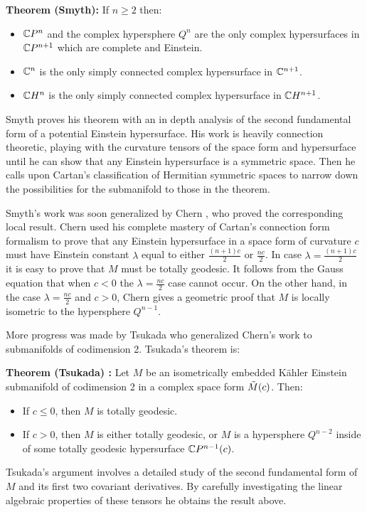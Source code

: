 {\bf Theorem (Smyth):} If $n \geq 2$ then:
%
\begin{itemize}
\item  $\mathbb{C}P^n$ and the complex hypersphere $Q^n$ are the only complex hypersurfaces in $\mathbb{C}P^{n+1}$ which are complete and Einstein.
\item  $\mathbb{C}^n$ is the only simply connected complex hypersurface in $\mathbb{C}^{n+1}$.
\item  $\mathbb{C}H^n$ is the only simply connected complex hypersurface in $\mathbb{C}H^{n+1}$.
\end{itemize}

Smyth proves his theorem with an in depth analysis of the second fundamental form of a potential Einstein hypersurface.  His work is heavily connection theoretic, playing with the curvature tensors of the space form and hypersurface until he can show that any Einstein hypersurface is a symmetric space.  Then he calls upon Cartan's classification of Hermitian symmetric spaces to narrow down the possibilities for the submanifold to those in the theorem.  

Smyth's work was soon generalized by Chern \cite{Ch}, who proved the corresponding local result.  Chern used his complete mastery of Cartan's connection form formalism to prove that any Einstein hypersurface in a space form of curvature $c$ must have Einstein constant $\lambda$ equal to either $\frac{(n+1)c}{2}$ or $\frac{nc}{2}$.  In case $\lambda = \frac{(n+1)c}{2}$ it is easy to prove that $M$ must be totally geodesic.  It follows from the Gauss equation that when $c<0$ the $\lambda = \frac{nc}{2}$ case cannot occur.  On the other hand, in the case $\lambda = \frac{nc}{2}$ and $c>0$, Chern gives a geometric proof that $M$ is locally isometric to the hypersphere $Q^{n-1}$.

More progress was made by Tsukada \cite{T} who generalized Chern's work to submanifolds of codimension 2.  Tsukada's theorem is:

{\bf Theorem (Tsukada) : } Let $M$ be an isometrically embedded K\"{a}hler Einstein submanifold of codimension 2 in a complex space form $\tilde{M}(c)$.  Then:
%
\begin{itemize}
\item If $c \leq 0$, then $M$ is totally geodesic.
\item If $c > 0$, then $M$ is either totally geodesic, or $M$ is a hypersphere $Q^{n-2}$ inside of some totally geodesic hypersurface $\mathbb{C}P^{n-1}(c)$.
\end{itemize}

Tsukada's argument involves a detailed study of the second fundamental form of $M$ and its first two covariant derivatives.  By carefully investigating the linear algebraic properties of these tensors he obtains the result above.


